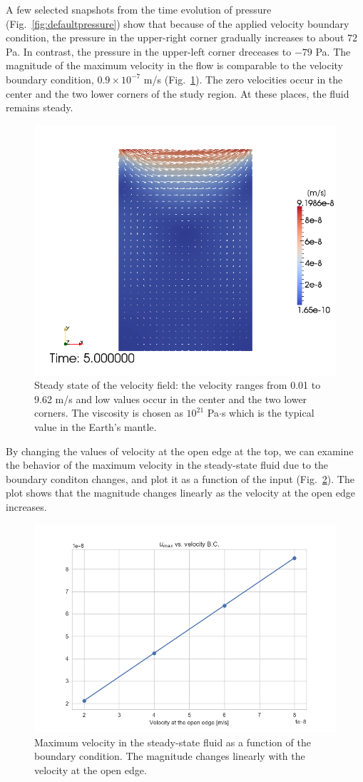 \documentclass[11pt]{article}
\numberwithin{figure}{section}  %
\numberwithin{equation}{section}  %
\begin{document}
\begin{multicols}{2}
A few selected snapshots from the time evolution of pressure (Fig.\ \ref{fig:defaultpressure}) show that because of the applied velocity boundary condition, the pressure in the upper-right corner gradually increases to about $72$ Pa. In contrast, the pressure in the upper-left corner dreceases to $-79$ Pa. The magnitude of the maximum velocity in the flow is comparable to the velocity boundary condition, $0.9\times10^{-7}$ m/s (Fig.\ \ref{fig:defaultvelocity}). The zero velocities occur in the center and the two lower corners of the study region. At these places, the fluid remains steady.

\begin{figure}[H]
	\centering
	\includegraphics[width=0.7\linewidth]{../Python/report/ns_routine/default_u_final}
	\caption{Steady state of the velocity field: the velocity ranges from 0.01 to 9.62 m/s and low values occur in the center and the two lower corners. The viscosity is chosen as $10^{21}$ Pa$\cdot$s which is the typical value in the Earth's mantle.}
	\label{fig:defaultvelocity}
\end{figure}

By changing the values of velocity at the open edge at the top, we can examine the behavior of the maximum velocity in the steady-state fluid due to the boundary conditon changes, and plot it as a function of the input (Fig.\ \ref{fig:velocity}). The plot shows that the magnitude changes linearly as the velocity at the open edge increases.

\begin{figure}[H]
	\centering
	\includegraphics[width=0.7\linewidth]{../Python/output/ns_solution/log/velocity}
	\caption{Maximum velocity in the steady-state fluid as a function of the boundary condition. The magnitude changes linearly with the velocity at the open edge.}
	\label{fig:velocity}
\end{figure}


\end{multicols}
\end{document}
